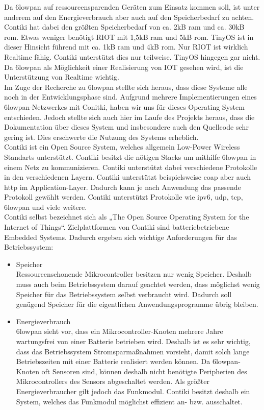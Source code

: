 	Da \ac{6lowpan} auf ressourcensparenden Geräten zum Einsatz kommen soll, ist unter anderem auf den Energieverbrauch aber auch auf den Speicherbedarf zu achten. Contiki hat dabei den größten Speicherbedarf von ca. 2kB \ac{ram} und ca. 30kB \ac{rom}. Etwas weniger benötigt RIOT mit 1,5kB \ac{ram} und 5kB \ac{rom}. TinyOS ist in dieser Hinsicht führend mit ca. 1kB \ac{ram} und 4kB \ac{rom}. Nur RIOT ist wirklich Realtime fähig. Contiki unterstützt dies nur teilweise. TinyOS hingegen gar nicht. Da \ac{6lowpan} als Möglichkeit einer Realisierung von IOT gesehen wird, ist die Unterstützung von Realtime wichtig.\\
	Im Zuge der Recherche zu \ac{6lowpan} stellte sich heraus, dass diese Systeme alle noch in der Entwicklungsphase sind. Aufgrund mehrere Implementierungen eines \ac{6lowpan}-Netzwerkes mit Conitki, haben wir uns für dieses Operating System entschieden. Jedoch stellte sich auch hier im Laufe des Projekts heraus, dass die Dokumentation über dieses System und insbesondere auch den Quellcode sehr gering ist. Dies erschwerte die Nutzung des Systems erheblich.\\
	
	Contiki ist ein Open Source System, welches allgemein Low-Power Wireless Standarts unterstützt. Contiki besitzt die nötigen Stacks um mithilfe \ac{6lowpan} in einem Netz zu kommunizieren. Contiki unterstützt dabei verschiedene Protokolle in den verschiedenen Layern. Contiki unterstützt beispielsweise \ac{coap} aber auch \ac{http} im Application-Layer. Dadurch kann je nach Anwendung das passende Protokoll gewählt werden. Contiki unterstützt Protokolle wie \ac{ipv6}, \ac{udp}, \ac{tcp}, \ac{6lowpan} und viele weitere.\\
	Contiki selbst bezeichnet sich als „The Open Source Operating System for the Internet of Things“. Zielplattformen von Contiki sind batteriebetriebene Embedded Systems. Dadurch ergeben sich wichtige Anforderungen für das Betriebssystem:
	\begin{itemize}
		\item Speicher\\
		Ressourcenschonende Mikrocontroller besitzen nur wenig Speicher. Deshalb muss auch beim Betriebssystem darauf geachtet werden, dass möglichst wenig Speicher für das Betriebssystem selbst verbraucht wird. Dadurch soll genügend Speicher für die eigentlichen Anwendungsprogramme übrig bleiben.       
		\item Energieverbrauch\\
		\ac{6lowpan} sieht vor, dass ein Mikrocontroller-Knoten mehrere Jahre wartungsfrei von einer Batterie betrieben wird. Deshalb ist es sehr wichtig, dass das Betriebssystem Stromsparmaßnahmen vorsieht, damit solch lange Betriebszeiten mit einer Batterie realisiert werden können. Da \ac{6lowpan}-Knoten oft Sensoren sind, können deshalb nicht benötigte Peripherien des Mikrocontrollers des Sensors abgeschaltet werden. Als größter Energieverbraucher gilt jedoch das Funkmodul. Contiki besitzt deshalb ein System, welches das Funkmodul möglichst effizient an- bzw. ausschaltet.
	\end{itemize}
	
